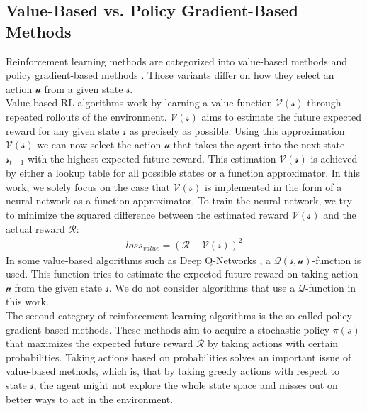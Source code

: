 \subsection*{Value-Based vs. Policy Gradient-Based Methods}\label{value_policy_based_methods}
Reinforcement learning methods are categorized into value-based methods and policy gradient-based methods \cite{tdlearning,policygradient}. Those variants differ on how they select an action $\mathcal{u}$ from a given state $\mathcal{s}$.\\
Value-based RL algorithms work by learning a value function $\mathcal{V(s)}$ through repeated rollouts of the environment. $\mathcal{V(s)}$ aims to estimate the future expected reward for any given state $\mathcal{s}$ as precisely as possible. Using this approximation $\mathcal{V(s)}$ we can now select the action $\mathcal{u}$ that takes the agent into the next state $\mathcal{s}_{t+1}$ with the highest expected future reward. This estimation $\mathcal{V(s)}$ is achieved by either a lookup table for all possible states or a function approximator. In this work, we solely focus on the case that $\mathcal{V(s)}$ is implemented in the form of a neural network as a function approximator. To train the neural network, we try to minimize the squared difference between the estimated reward $\mathcal{V(s)}$ and the actual reward $\mathcal{R}$:
\begin{gather*}
loss_{value}=(\mathcal{R}-\mathcal{V(s)})^2
\end{gather*}
In some value-based algorithms such as Deep Q-Networks \cite{mnih2013playing}, a $\mathcal{Q(s,u)}$-function is used. This function tries to estimate the expected future reward on taking action $\mathcal{u}$ from the given state $\mathcal{s}$. We do not consider algorithms that use a $\mathcal{Q}$-function in this work.\\
The second category of reinforcement learning algorithms is the so-called policy gradient-based methods. These methods aim to acquire a stochastic policy $\pi(s)$ that maximizes the expected future reward $\mathcal{R}$ by taking actions with certain probabilities. Taking actions based on probabilities solves an important issue of value-based methods, which is, that by taking greedy actions with respect to state  $\mathcal{s}$, the agent might not explore the whole state space and misses out on better ways to act in the environment.

